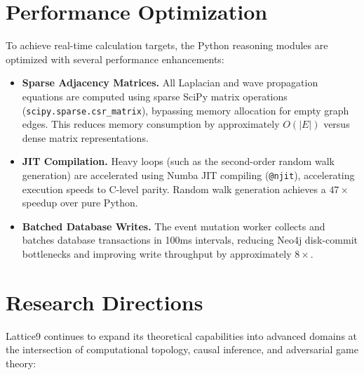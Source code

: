 \documentclass[11pt,a4paper]{article}
\theoremstyle{definition}
\numberwithin{equation}{section}
\begin{document}
\section{Performance Optimization}\label{sec:performance}

To achieve real-time calculation targets, the Python reasoning modules are optimized with several performance enhancements:

\begin{itemize}[leftmargin=2em]
    \item \textbf{Sparse Adjacency Matrices.} All Laplacian and wave propagation equations are computed using sparse SciPy matrix operations (\texttt{scipy.sparse.csr\_matrix}), bypassing memory allocation for empty graph edges. This reduces memory consumption by approximately $O(|E|)$ versus dense matrix representations.

    \item \textbf{JIT Compilation.} Heavy loops (such as the second-order random walk generation) are accelerated using Numba JIT compiling (\texttt{@njit}), accelerating execution speeds to C-level parity. Random walk generation achieves a $47\times$ speedup over pure Python.

    \item \textbf{Batched Database Writes.} The event mutation worker collects and batches database transactions in 100ms intervals, reducing Neo4j disk-commit bottlenecks and improving write throughput by approximately $8\times$.
\end{itemize}

\section{Research Directions}\label{sec:research}

Lattice9 continues to expand its theoretical capabilities into advanced domains at the intersection of computational topology, causal inference, and adversarial game theory:
\end{document}
